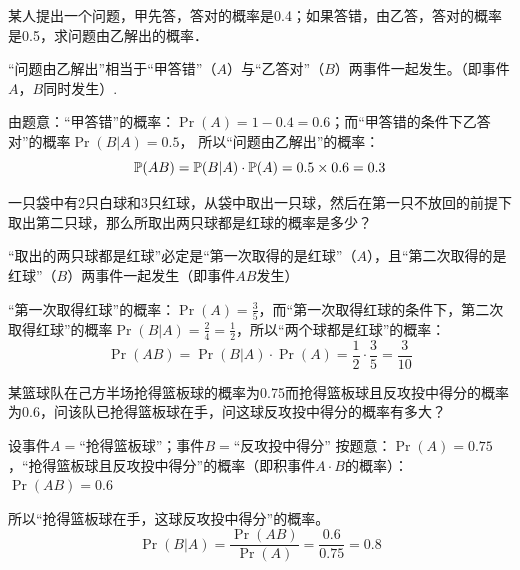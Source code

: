 \begin{example}
    某人提出一个问题，甲先答，答对的概率是0.4；如果答错，由乙答，答对的概率是0.5，求问题由乙解出的概率．
\end{example}

\begin{solution}
“问题由乙解出”相当于“甲答错”（$A$）与“乙答对”（$B$）两事件一起发生。（即事件$A$，$B$同时发生）.

由题意：“甲答错”的概率：$\Pr(A)=1-0.4=0.6$；而“甲答错的条件下乙答对”的概率$\Pr(B|A)=0.5$，
所以“问题由乙解出”的概率：
\[\mathbb{P}(AB)=\mathbb{P}(B|A)\cdot \mathbb{P}(A)=0.5\times0.6=0.3\]
\end{solution}

\begin{example}
    一只袋中有2只白球和3只红球，从袋中取出一只球，然后在第一只不放回的前提下取出第二只球，那么所取出两只球都是红球的概率是多少？
\end{example}

\begin{solution}
    “取出的两只球都是红球”必定是“第一次取得的是红球”（$A$），且“第二次取得的是红球”（$B$）两事件一起发生（即事件$AB$发生）

    “第一次取得红球”的概率：$\Pr(A)=\frac{3}{5}$，而“第一次取得红球的条件下，第二次取得红球”的概率$\Pr(B|A)=\frac{2}{4}=\frac{1}{2}$，所以“两个球都是红球”的概率：
\[\Pr(AB)=\Pr(B|A)\cdot \Pr(A)=\frac{1}{2}\cdot \frac{3}{5}=\frac{3}{10}\]
\end{solution}

\begin{example}
    某篮球队在己方半场抢得篮板球的概率为0.75而抢得篮板球且反攻投中得分的概率为0.6，问该队已抢得篮板球在手，问这球反攻投中得分的概率有多大？
\end{example}

\begin{solution}
    设事件$A=$“抢得篮板球”；事件$B=$“反攻投中得分”
按题意：$\Pr(A)=0.75$，“抢得篮板球且反攻投中得分”的概率（即积事件$A\cdot B$的概率）：$\Pr(AB)=0.6$

所以“抢得篮板球在手，这球反攻投中得分”的概率。
\[\Pr(B|A)=\frac{\Pr(AB)}{\Pr(A)}=\frac{0.6}{0.75}=0.8\]
\end{solution}

